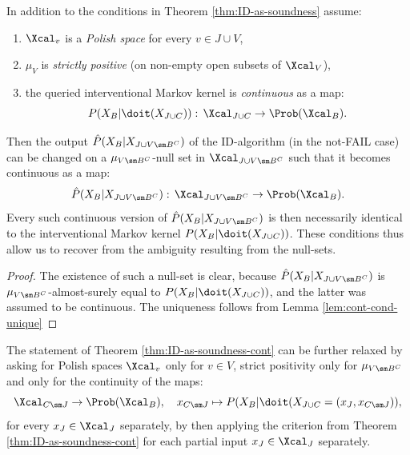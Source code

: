 \begin{Thm}
    \label{thm:ID-as-soundness-cont}
    In addition to the conditions in Theorem \ref{thm:ID-as-soundness} assume:
          \begin{enumerate}
              \item $\Xcal_v$ is a \emph{Polish space} for every $v \in J \cup V$,
              \item $\mu_{V}$ is \emph{strictly positive} (on non-empty open subsets of $\Xcal_V$),
              \item the queried interventional Markov kernel is \emph{continuous} as a map:
                  \[ P(X_B|\doit(X_{J \cup C})):\, \Xcal_{J \cup C} \to \Prob(\Xcal_B).\]
          \end{enumerate}
          Then the output $\hat P(X_B|X_{J \cup V \sm B^C})$ of the ID-algorithm (in the not-FAIL case) 
          can be changed on a $\mu_{V\sm B^C}$-null set in $\Xcal_{J \cup V \sm B^C}$ such that it becomes continuous as a map:
        \[ \hat P(X_B|X_{J \cup V \sm B^C}):\, \Xcal_{J \cup V \sm B^C} \to \Prob(\Xcal_B). \]
          Every such continuous version of $\hat P(X_B|X_{J \cup V \sm B^C})$ is then necessarily identical to
          the interventional Markov kernel $P(X_B|\doit(X_{J \cup C}))$. 
          These conditions thus allow us to recover from the ambiguity resulting from the null-sets.
          \begin{proof}
              The existence of such a null-set is clear, 
              because $\hat P(X_B|X_{J \cup V \sm B^C})$ is $\mu_{V\sm B^C}$-almost-surely equal to
              $P(X_B|\doit(X_{J \cup C}))$, and the latter was assumed to be continuous.
              The uniqueness follows from Lemma \ref{lem:cont-cond-unique}
          \end{proof}
\end{Thm}

\begin{Rem}
    The statement of Theorem \ref{thm:ID-as-soundness-cont} 
    can be further relaxed by asking for Polish spaces $\Xcal_v$ only for $v \in V$,
          strict positivity only for $\mu_{V\sm B^C}$ and only for the continuity of the maps:
          \[  \Xcal_{C \sm J} \to \Prob(\Xcal_B),\quad x_{C\sm J} \mapsto P(X_B|\doit(X_{J \cup C}=(x_J,x_{C \sm J})), \]
          for every $x_J \in \Xcal_J$ separately, by then applying the criterion from Theorem \ref{thm:ID-as-soundness-cont} 
          for each partial input $x_J\in \Xcal_J$ separately.
\end{Rem}

